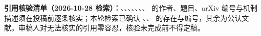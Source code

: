 \documentclass[11pt,a4paper]{ctexart}
\newcommand{\1}[1]{\mathbb{1}\!\left[#1\right]}
\begin{document}
\textbf{引用核验清单（2026-10-28 检索）：}\cite{zeng2025mtgrpo}、\cite{tips2026}、\cite{pibrfs2026}、\cite{pan2025sweetrl}、\cite{cao2026atpo}、\cite{grpovps2026}、\cite{tang2026rebel}、\cite{abstention2026} 的作者、题目、arXiv 编号与机制描述须在投稿前逐条核实；本轮检索已确认 \cite{feng2025gigpo}、\cite{liang2026gaca}、\cite{mazzaccara2024learning} 的存在与编号，其余为公认文献。审稿人对无法核实的引用零容忍，核验未完成前不得定稿。
\end{document}
